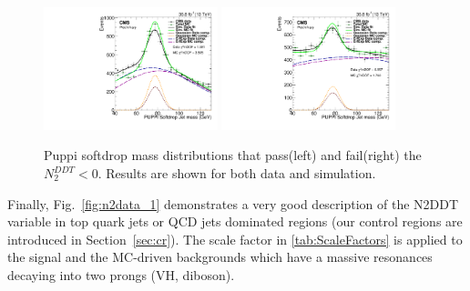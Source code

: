 \begin{figure}[h]
\centering
\includegraphics[width=0.45\textwidth]{figures/higgstagging/n2ddt/CombinedPlot_model_data_em_CA15.pdf}
\includegraphics[width=0.45\textwidth]{figures/higgstagging/n2ddt/CombinedPlot_model_data_failN2DDTcut_em_CA15.pdf}
\caption{Puppi softdrop mass distributions that pass(left) and fail(right) the $N_{2}^{DDT}<0$. Results are shown for both data and simulation.}
\label{fig:TotalFits}
\end{figure}



Finally, Fig.~\ref{fig:n2data_1} demonstrates a very good description of the N2DDT variable in top quark jets or QCD jets dominated regions (our control regions are introduced in Section~\ref{sec:cr}). The scale factor in \ref{tab:ScaleFactors} is applied to the signal and the MC-driven backgrounds which have a massive resonances decaying into two prongs (VH, diboson). 



